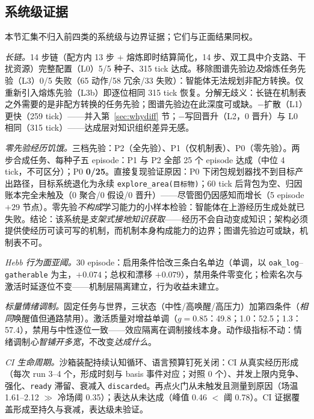\documentclass[10pt,a4paper]{ctexart}
\begin{document}
\subsection{系统级证据}
\label{sec:res-system}
本节汇集不归入前四类的系统级与边界证据；它们与正面结果同权。

\emph{长链。}14 步链（配方内 13 步 + 熔炼即时结算简化，14 步、双工具中介支路、干扰资源）完整配置（L0）5/5 种子、315 tick 达成。移除图谱先验边\emph{及}熔炼任务先验（L3）0/5 失败（65 动作/58 冗余/33 失败）：智能体无法规划非配方转换。仅重新引入熔炼先验（L3b）即逐位相同 315 tick 恢复。分解无歧义：长链在机制表之外需要的是非配方转换的任务先验；图谱先验边在此深度可或缺。$-$扩散（L1）更快（259 tick）——并入第~\ref{sec:whydiff} 节；$-$写回晋升（L2，0 晋升）与 L0 相同（315 tick）——达成层对知识组织差异无感。

\emph{零先验经历饥饿。}三档先验：P2（全先验）、P1（仅机制表）、P0（零先验）。两步合成任务、每种子五 episode：P1 与 P2 全部 25 个 episode 达成（中位 4 tick，不可区分）；P0 \textbf{0/25}。直接复现验证原因：P0 下闭包规划器找不到目标产出路径，目标系统退化为永续 \texttt{explore\_area(目标物)}；60 tick 后背包为空、归因账本完全未触及（0 聚合/0 假设/0 晋升）——尽管图仍因感知而增长（5 episode $+29$ 节点）。零先验\emph{不构成}学习能力的小样本检验：智能体在上游经历生成处就已失败。结论：该系统是\emph{支架式接地知识获取}——经历不会自动变成知识；架构必须提供使经历可读可写的机制，而机制本身构成能力的边界；图谱先验边可或缺，机制表不可。

\emph{Hebb 行为面亚阈。}30 episode：启用条件恰改三条白名单边（单调，以 \texttt{oak\_log}--\texttt{gatherable} 为主，$+0.074$；总权和漂移 $+0.079$），禁用条件零变化；检索名次与激活时延逐位不变——机制层隔离建立，行为收益未建立。

\emph{标量情绪调制。}固定任务与世界，三状态（中性/高唤醒/高压力）加第四条件（\emph{相同}唤醒值但通路禁用）。激活质量对增益单调（$g{=}0.85$：49.8；1.0：52.5；1.3：57.4），禁用与中性逐位一致——效应隔离在调制接线本身。动作级指标不动：情绪调制\emph{心智铺开多宽}，不改变\emph{达成什么}。

\emph{CI 生命周期。}沙箱装配持续认知循环、语言预算钉死关闭：CI 从真实经历形成（每次 run 3--4 个，形成时刻与 basis 事件对应；对照 0 个）、并发上限内竞争、强化、\texttt{ready} 滞留、衰减入 \texttt{discarded}。再点火门从未触发且测量到原因（场温 1.61--2.12 $\gg$ 冷场阈 0.35）；表达从未达成（峰值 0.46 $<$ 阈 0.78）。CI 证据覆盖形成至持久与衰减，表达级未验证。
\end{document}
